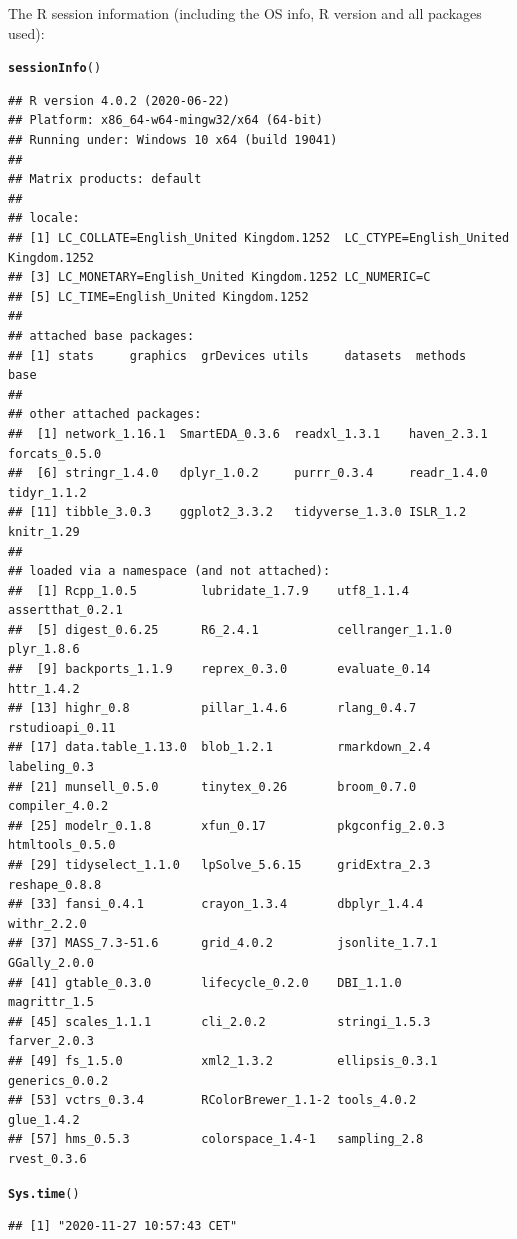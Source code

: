 \documentclass{article}\usepackage[]{graphicx}\usepackage[]{color}
\makeatletter
\newcommand{\hlstd}[1]{\textcolor[rgb]{0.345,0.345,0.345}{#1}}%
\newcommand{\hlkwd}[1]{\textcolor[rgb]{0.737,0.353,0.396}{\textbf{#1}}}%
\newenvironment{kframe}{%
 \def\at@end@of@kframe{}%
 \ifinner\ifhmode%
  \def\at@end@of@kframe{\end{minipage}}%
  \begin{minipage}{\columnwidth}%
 \fi\fi%
 \def\FrameCommand##1{\hskip\@totalleftmargin \hskip-\fboxsep
 \colorbox{shadecolor}{##1}\hskip-\fboxsep
     \hskip-\linewidth \hskip-\@totalleftmargin \hskip\columnwidth}%
 \MakeFramed {\advance\hsize-\width
   \@totalleftmargin\z@ \linewidth\hsize
   \@setminipage}}%
 {\par\unskip\endMakeFramed%
 \at@end@of@kframe}
\newenvironment{knitrout}{}{} %
\makeatother
\begin{document}
The R session information (including the OS info, R version and all
packages used):

\begin{knitrout}
\color{fgcolor}\begin{kframe}
\begin{alltt}
\hlkwd{sessionInfo}\hlstd{()}
\end{alltt}
\begin{verbatim}
## R version 4.0.2 (2020-06-22)
## Platform: x86_64-w64-mingw32/x64 (64-bit)
## Running under: Windows 10 x64 (build 19041)
## 
## Matrix products: default
## 
## locale:
## [1] LC_COLLATE=English_United Kingdom.1252  LC_CTYPE=English_United Kingdom.1252   
## [3] LC_MONETARY=English_United Kingdom.1252 LC_NUMERIC=C                           
## [5] LC_TIME=English_United Kingdom.1252    
## 
## attached base packages:
## [1] stats     graphics  grDevices utils     datasets  methods   base     
## 
## other attached packages:
##  [1] network_1.16.1  SmartEDA_0.3.6  readxl_1.3.1    haven_2.3.1     forcats_0.5.0  
##  [6] stringr_1.4.0   dplyr_1.0.2     purrr_0.3.4     readr_1.4.0     tidyr_1.1.2    
## [11] tibble_3.0.3    ggplot2_3.3.2   tidyverse_1.3.0 ISLR_1.2        knitr_1.29     
## 
## loaded via a namespace (and not attached):
##  [1] Rcpp_1.0.5         lubridate_1.7.9    utf8_1.1.4         assertthat_0.2.1  
##  [5] digest_0.6.25      R6_2.4.1           cellranger_1.1.0   plyr_1.8.6        
##  [9] backports_1.1.9    reprex_0.3.0       evaluate_0.14      httr_1.4.2        
## [13] highr_0.8          pillar_1.4.6       rlang_0.4.7        rstudioapi_0.11   
## [17] data.table_1.13.0  blob_1.2.1         rmarkdown_2.4      labeling_0.3      
## [21] munsell_0.5.0      tinytex_0.26       broom_0.7.0        compiler_4.0.2    
## [25] modelr_0.1.8       xfun_0.17          pkgconfig_2.0.3    htmltools_0.5.0   
## [29] tidyselect_1.1.0   lpSolve_5.6.15     gridExtra_2.3      reshape_0.8.8     
## [33] fansi_0.4.1        crayon_1.3.4       dbplyr_1.4.4       withr_2.2.0       
## [37] MASS_7.3-51.6      grid_4.0.2         jsonlite_1.7.1     GGally_2.0.0      
## [41] gtable_0.3.0       lifecycle_0.2.0    DBI_1.1.0          magrittr_1.5      
## [45] scales_1.1.1       cli_2.0.2          stringi_1.5.3      farver_2.0.3      
## [49] fs_1.5.0           xml2_1.3.2         ellipsis_0.3.1     generics_0.0.2    
## [53] vctrs_0.3.4        RColorBrewer_1.1-2 tools_4.0.2        glue_1.4.2        
## [57] hms_0.5.3          colorspace_1.4-1   sampling_2.8       rvest_0.3.6
\end{verbatim}
\begin{alltt}
\hlkwd{Sys.time}\hlstd{()}
\end{alltt}
\begin{verbatim}
## [1] "2020-11-27 10:57:43 CET"
\end{verbatim}
\end{kframe}
\end{knitrout}
\end{document}
